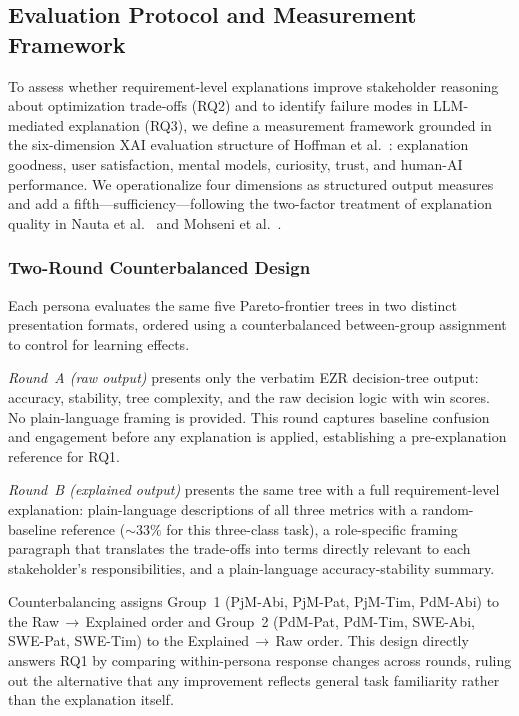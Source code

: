 \documentclass[sigconf,review]{acmart}
\begin{document}
\subsection{Evaluation Protocol and Measurement Framework}
\label{subsec:eval-protocol}

To assess whether requirement-level explanations improve stakeholder
reasoning about optimization trade-offs (RQ2) and to identify failure
modes in LLM-mediated explanation (RQ3), we define a measurement
framework grounded in the six-dimension XAI evaluation structure of
Hoffman et al.~\cite{hoffman2023measures}: explanation goodness, user
satisfaction, mental models, curiosity, trust, and human-AI performance.
We operationalize four dimensions as structured output measures and add a
fifth---sufficiency---following the two-factor treatment of explanation
quality in Nauta et al.~\cite{nauta2023anecdotal} and Mohseni et
al.~\cite{mohseni2021multidisciplinary}.

\subsubsection{Two-Round Counterbalanced Design}

Each persona evaluates the same five Pareto-frontier trees in two
distinct presentation formats, ordered using a counterbalanced
between-group assignment to control for learning effects.

\textit{Round~A (raw output)} presents only the verbatim EZR
decision-tree output: accuracy, stability, tree complexity, and the raw
decision logic with win scores. No plain-language framing is provided.
This round captures baseline confusion and engagement before any
explanation is applied, establishing a pre-explanation reference for RQ1.

\textit{Round~B (explained output)} presents the same tree with a full
requirement-level explanation: plain-language descriptions of all three
metrics with a random-baseline reference (${\sim}33\%$ for this
three-class task), a role-specific framing paragraph that translates the
trade-offs into terms directly relevant to each stakeholder's
responsibilities, and a plain-language accuracy-stability summary.

Counterbalancing assigns Group~1 (PjM-Abi, PjM-Pat, PjM-Tim, PdM-Abi)
to the Raw\,$\rightarrow$\,Explained order and Group~2 (PdM-Pat, PdM-Tim,
SWE-Abi, SWE-Pat, SWE-Tim) to the Explained\,$\rightarrow$\,Raw order.
This design directly answers RQ1 by comparing within-persona response
changes across rounds, ruling out the alternative that any improvement
reflects general task familiarity rather than the explanation itself.
\end{document}
